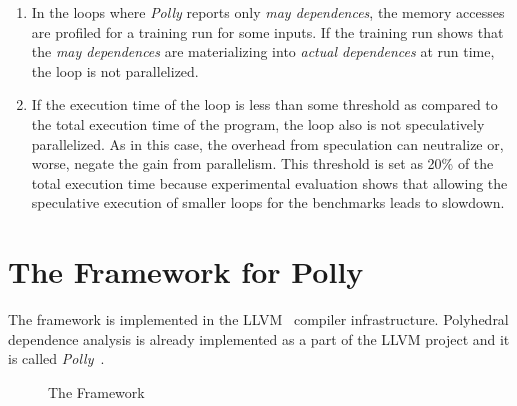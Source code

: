 \documentclass[10pt]{report}          %
\begin{document}
\begin{enumerate}
\item In the loops where \textit{Polly} reports only \textit{may dependences}, the memory accesses are profiled for a training run for some inputs.  If the training run shows that the \textit{may dependences} are materializing into \textit{actual dependences} at run time, the loop is not parallelized.
\item If the execution time of the loop is less than some threshold as compared to the total execution time of the program, the loop also is not speculatively parallelized.  As in this case, the overhead from speculation can neutralize or, worse, negate the gain from parallelism. This threshold is set as 20\% of the total execution time because experimental evaluation shows that allowing  the speculative execution of smaller loops for the benchmarks leads to slowdown. 
\end{enumerate}

\section{The Framework for Polly}
\label{section:framework}

The framework is implemented in the LLVM~\cite{llvm} compiler infrastructure. Polyhedral dependence analysis is already implemented as a part of the LLVM project and it is called \textit{Polly}~\cite{grosserImpact11}. \\

\begin{figure}[h]
\begin{center}
\renewcommand{\figure}{Fig.}
\caption{ The Framework}
\end{center}
\label{fig:framework_polly}
\end{figure}
\end{document}
